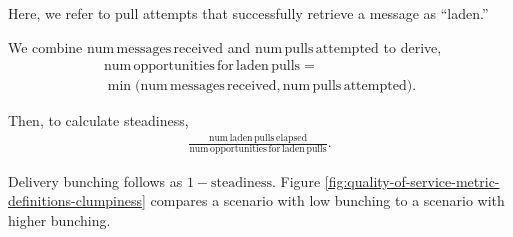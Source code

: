 Here, we refer to pull attempts that successfully retrieve a message as ``laden.''

We combine $\mathrm{num\,messages\,received}$ and $\mathrm{num\,pulls\,attempted}$ to derive,
\begin{align*}
  \mathrm{num\,opportunities\,for\,laden\,pulls} = \\
   \min\Big(\mathrm{num\,messages\,received}, \mathrm{num\,pulls\,attempted}\Big).
\end{align*}

Then, to calculate steadiness,
\begin{align*}
  \frac{
    \mathrm{num\,laden\,pulls\,elapsed}
  }{
    \mathrm{num\,opportunities\,for\,laden\,pulls}
  }.
\end{align*}

Delivery bunching follows as $1 - \mathrm{steadiness}$.
Figure \ref{fig:quality-of-service-metric-definitions-clumpiness} compares a scenario with low bunching to a scenario with higher bunching.
